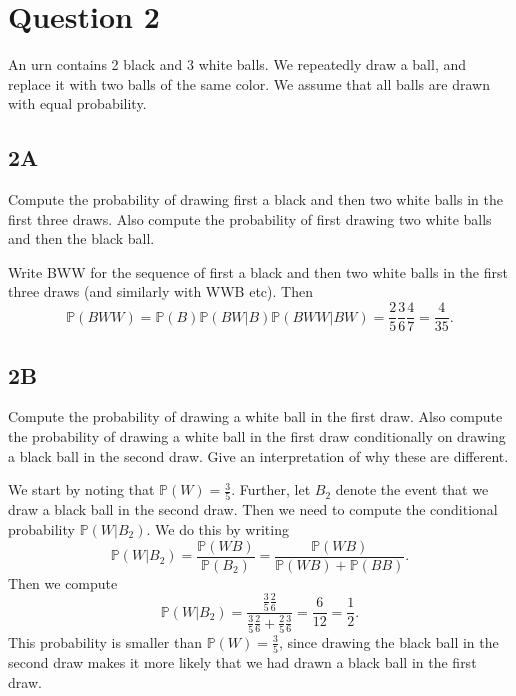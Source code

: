 \section{Question 2}

\begin{question}
    An urn contains 2 black and 3 white balls. We repeatedly draw a ball, and replace it with two balls of the same color. We assume that all balls are drawn with equal probability.
\end{question}

\subsection{2A}

\begin{question}
    Compute the probability of drawing first a black and then two white balls in the first three draws. Also compute the probability of first drawing two white balls and then the black ball.
\end{question}

\begin{answer}
    Write BWW for the sequence of first a black and then two white balls in the first three draws (and similarly with WWB etc). Then 
    \begin{equation*}
        \mathbb{P}(BWW) = \mathbb{P}(B) \mathbb{P}(BW | B) \mathbb{P}(BWW | BW) = \frac{2}{5} \frac{3}{6} \frac{4}{7} = \frac{4}{35}.
    \end{equation*}
\end{answer}

\subsection{2B}

\begin{question}
    Compute the probability of drawing a white ball in the first draw. Also compute the probability of drawing a white ball in the first draw conditionally on drawing a black ball in the second draw. Give an interpretation of why these are different.
\end{question}

\begin{answer}
    We start by noting that $\mathbb{P}(W) = \frac{3}{5}$. Further, let $B_2$ denote the event that we draw a black ball in the second draw. Then we need to compute the conditional probability $\mathbb{P}(W | B_2)$. We do this by writing
    \begin{equation*}
        \mathbb{P}(W | B_2) = \frac{\mathbb{P}(WB)}{\mathbb{P}(B_2)} = \frac{\mathbb{P}(WB)}{\mathbb{P}(WB) + \mathbb{P}(BB)}.
    \end{equation*}
    Then we compute
    \begin{equation*}
        \mathbb{P}(W | B_2) = \frac{\frac{3}{5} \frac{2}{6}}{\frac{3}{5} \frac{2}{6} + \frac{2}{5} \frac{3}{6}} = \frac{6}{12} = \frac{1}{2}.
    \end{equation*}
    This probability is smaller than $\mathbb{P}(W) = \frac{3}{5}$, since drawing the black ball in the second draw makes it more likely that we had drawn a black ball in the first draw.
\end{answer}
